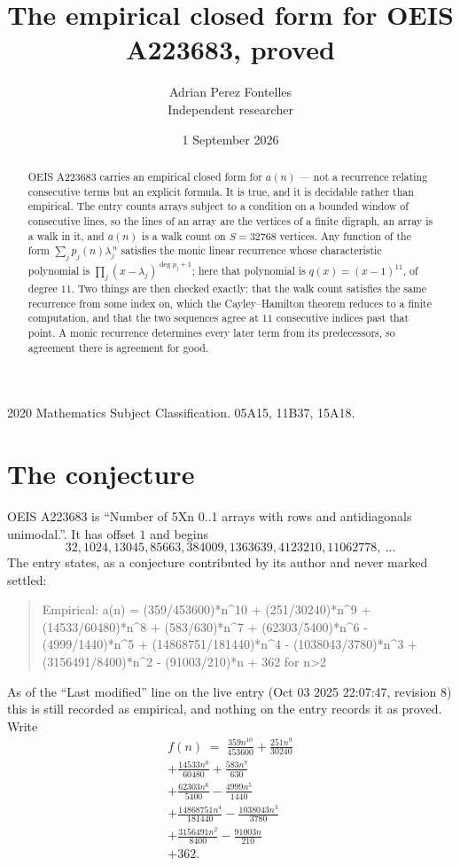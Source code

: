 \documentclass[11pt,a4paper]{article}
\title{The empirical closed form for OEIS A223683, proved}
\author{Adrian Perez Fontelles\\ \small Independent researcher}
\date{1 September 2026}
\theoremstyle{plain}
\theoremstyle{definition}
\begin{document}
\maketitle

\begin{abstract}
OEIS A223683 carries an empirical closed form for $a(n)$ --- not a recurrence relating
consecutive terms but an explicit formula. It is true, and it is decidable rather than
empirical. The entry counts arrays subject to a condition on a bounded window of consecutive lines, so the lines of an array are the
vertices of a finite digraph, an array is a walk in it, and $a(n)$ is a walk count on
$S=32768$ vertices. Any function of the form $\sum_j p_j(n)\lambda_j^{\,n}$ satisfies the
monic linear recurrence whose characteristic polynomial is
$\prod_j(x-\lambda_j)^{\deg p_j+1}$; here that polynomial is $q(x)=(x-1)^{11}$, of degree
$11$. Two things are then checked exactly: that the walk count satisfies the same
recurrence from some index on, which the Cayley--Hamilton theorem reduces to a finite
computation, and that the two sequences agree at $11$ consecutive indices past that
point. A monic recurrence determines every later term from its predecessors, so agreement
there is agreement for good.
\end{abstract}

\noindent\small 2020 Mathematics Subject Classification. 05A15, 11B37, 15A18.\normalsize

\section{The conjecture}

OEIS A223683 is ``Number of 5Xn 0..1 arrays with rows and antidiagonals unimodal.''. It has offset $1$ and begins
\[
32, 1024, 13045, 85663, 384009, 1363639, 4123210, 11062778,\ \dots
\]
The entry states, as a conjecture contributed by its author and never marked settled:
\begin{quote}
Empirical: a(n) = (359/453600)*n\^{}10 + (251/30240)*n\^{}9 + (14533/60480)*n\^{}8 + (583/630)*n\^{}7 + (62303/5400)*n\^{}6 - (4999/1440)*n\^{}5 + (14868751/181440)*n\^{}4 - (1038043/3780)*n\^{}3 + (3156491/8400)*n\^{}2 - (91003/210)*n + 362 for n>2
\end{quote}
As of the ``Last modified'' line on the live entry (Oct 03 2025 22:07:47, revision 8) this is still
recorded as empirical, and nothing on the entry records it as proved. Write
\begin{multline*}
f(n)\;=\;\frac{359 n^{10}}{453600} + \frac{251 n^{9}}{30240} \\
+ \frac{14533 n^{8}}{60480} + \frac{583 n^{7}}{630} \\
+ \frac{62303 n^{6}}{5400} - \frac{4999 n^{5}}{1440} \\
+ \frac{14868751 n^{4}}{181440} - \frac{1038043 n^{3}}{3780} \\
+ \frac{3156491 n^{2}}{8400} - \frac{91003 n}{210} \\
+ 362.
\end{multline*}
\end{document}
